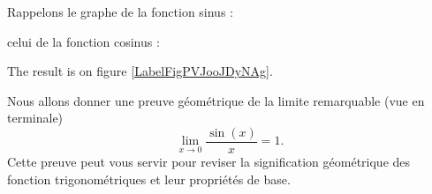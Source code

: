 Rappelons le graphe de la fonction sinus :
\begin{center}
   
\end{center}
celui de la fonction cosinus :
\begin{center}
   
\end{center}

The result is on figure \ref{LabelFigPVJooJDyNAg}. %
\newcommand{\CaptionFigPVJooJDyNAg}{<+Type your caption here+>}


Nous allons donner une preuve géométrique de la limite remarquable (vue en terminale) 
\begin{equation}\label{sinsurx}
  \lim_{x\to 0} \frac{\sin(x)}{x} = 1.
\end{equation}
Cette preuve peut vous servir pour reviser la signification géométrique des fonction trigonométriques et leur propriétés de base. 
